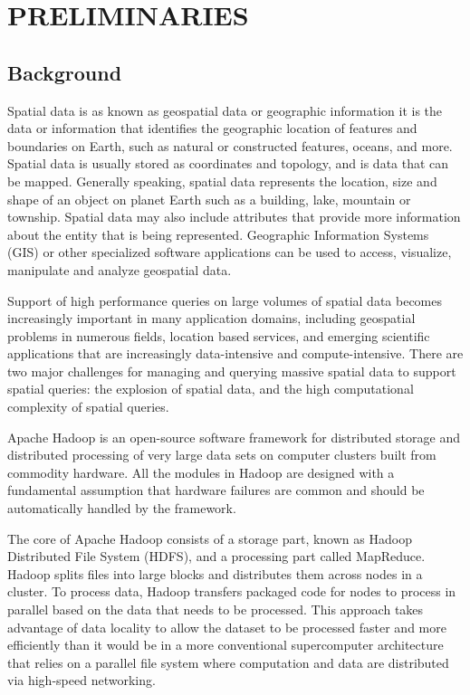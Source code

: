\section{PRELIMINARIES}
\label{sect:preliminaries}

\subsection{Background}
Spatial data is as known as geospatial data or geographic information it is the data or information that identifies the geographic location of features and boundaries on Earth, such as natural or constructed features, oceans, and more. Spatial data is usually stored as coordinates and topology, and is data that can be mapped. Generally speaking, spatial data represents the location, size and shape of an object on planet Earth such as a building, lake, mountain or township. Spatial data may also include attributes that provide more information about the entity that is being represented. Geographic Information Systems (GIS) or other specialized software applications can be used to access, visualize, manipulate and analyze geospatial data.


Support of high performance queries on large volumes of spatial
data becomes increasingly important in many application domains,
including geospatial problems in numerous fields, location based
services, and emerging scientific applications that are increasingly
data-intensive and compute-intensive. There are two major challenges for managing and querying
massive spatial data to support spatial queries: the explosion of spatial data, and the high computational complexity of spatial queries.

Apache Hadoop is an open-source software framework for distributed storage and distributed processing of very large data sets on computer clusters built from commodity hardware. All the modules in Hadoop are designed with a fundamental assumption that hardware failures are common and should be automatically handled by the framework.

The core of Apache Hadoop consists of a storage part, known as Hadoop Distributed File System (HDFS), and a processing part called MapReduce. Hadoop splits files into large blocks and distributes them across nodes in a cluster. To process data, Hadoop transfers packaged code for nodes to process in parallel based on the data that needs to be processed. This approach takes advantage of data locality to allow the dataset to be processed faster and more efficiently than it would be in a more conventional supercomputer architecture that relies on a parallel file system where computation and data are distributed via high-speed networking. 

